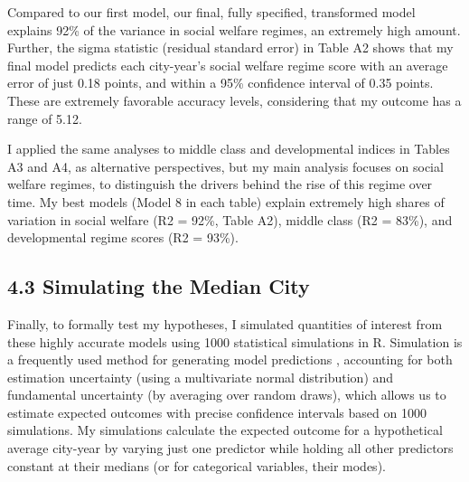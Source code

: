 \documentclass[preprint, 3p,
authoryear]{elsarticle} %
\begin{document}
Compared to our first model, our final, fully specified, transformed
model explains 92\% of the variance in social welfare regimes, an
extremely high amount. Further, the sigma statistic (residual standard
error) in Table A2 shows that my final model predicts each city-year's
social welfare regime score with an average error of just 0.18 points,
and within a 95\% confidence interval of 0.35 points. These are
extremely favorable accuracy levels, considering that my outcome has a
range of 5.12.

I applied the same analyses to middle class and developmental indices in
Tables A3 and A4, as alternative perspectives, but my main analysis
focuses on social welfare regimes, to distinguish the drivers behind the
rise of this regime over time. My best models (Model 8 in each table)
explain extremely high shares of variation in social welfare (R2 = 92\%,
Table A2), middle class (R2 = 83\%), and developmental regime scores (R2
= 93\%).

\hypertarget{simulating-the-median-city}{%
\subsection{4.3 Simulating the Median
City}\label{simulating-the-median-city}}

Finally, to formally test my hypotheses, I simulated quantities of
interest from these highly accurate models using 1000 statistical
simulations in R. Simulation is a frequently used method for generating
model predictions
\citep{king_et_al_2001, imai_et_al_2008, choirat_et_al_2017}, accounting
for both estimation uncertainty (using a multivariate normal
distribution) and fundamental uncertainty (by averaging over random
draws), which allows us to estimate expected outcomes with precise
confidence intervals based on 1000 simulations. My simulations calculate
the expected outcome for a hypothetical average city-year by varying
just one predictor while holding all other predictors constant at their
medians (or for categorical variables, their modes).
\end{document}

